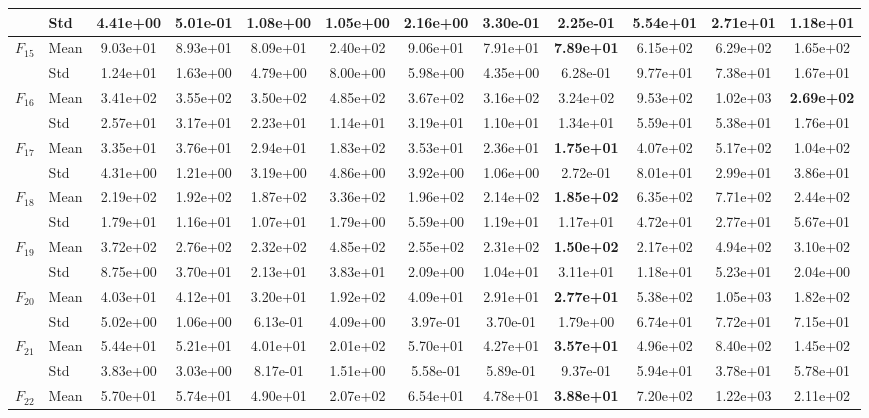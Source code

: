 \begin{center}
\begin{longtable}{clcccccccccc}
 & Std & 4.41e+00 & 5.01e-01 & 1.08e+00 & 1.05e+00 & 2.16e+00 & 3.30e-01 & 2.25e-01 & 5.54e+01 & 2.71e+01 & 1.18e+01 \\
\midrule
$F_{15}$ & Mean & 9.03e+01 & 8.93e+01 & 8.09e+01 & 2.40e+02 & 9.06e+01 & 7.91e+01 & \textbf{7.89e+01} & 6.15e+02 & 6.29e+02 & 1.65e+02 \\
 & Std & 1.24e+01 & 1.63e+00 & 4.79e+00 & 8.00e+00 & 5.98e+00 & 4.35e+00 & 6.28e-01 & 9.77e+01 & 7.38e+01 & 1.67e+01 \\
\midrule
$F_{16}$ & Mean & 3.41e+02 & 3.55e+02 & 3.50e+02 & 4.85e+02 & 3.67e+02 & 3.16e+02 & 3.24e+02 & 9.53e+02 & 1.02e+03 & \textbf{2.69e+02} \\
 & Std & 2.57e+01 & 3.17e+01 & 2.23e+01 & 1.14e+01 & 3.19e+01 & 1.10e+01 & 1.34e+01 & 5.59e+01 & 5.38e+01 & 1.76e+01 \\
\midrule
$F_{17}$ & Mean & 3.35e+01 & 3.76e+01 & 2.94e+01 & 1.83e+02 & 3.53e+01 & 2.36e+01 & \textbf{1.75e+01} & 4.07e+02 & 5.17e+02 & 1.04e+02 \\
 & Std & 4.31e+00 & 1.21e+00 & 3.19e+00 & 4.86e+00 & 3.92e+00 & 1.06e+00 & 2.72e-01 & 8.01e+01 & 2.99e+01 & 3.86e+01 \\
\midrule
$F_{18}$ & Mean & 2.19e+02 & 1.92e+02 & 1.87e+02 & 3.36e+02 & 1.96e+02 & 2.14e+02 & \textbf{1.85e+02} & 6.35e+02 & 7.71e+02 & 2.44e+02 \\
 & Std & 1.79e+01 & 1.16e+01 & 1.07e+01 & 1.79e+00 & 5.59e+00 & 1.19e+01 & 1.17e+01 & 4.72e+01 & 2.77e+01 & 5.67e+01 \\
\midrule
$F_{19}$ & Mean & 3.72e+02 & 2.76e+02 & 2.32e+02 & 4.85e+02 & 2.55e+02 & 2.31e+02 & \textbf{1.50e+02} & 2.17e+02 & 4.94e+02 & 3.10e+02 \\
 & Std & 8.75e+00 & 3.70e+01 & 2.13e+01 & 3.83e+01 & 2.09e+00 & 1.04e+01 & 3.11e+01 & 1.18e+01 & 5.23e+01 & 2.04e+00 \\
\midrule
$F_{20}$ & Mean & 4.03e+01 & 4.12e+01 & 3.20e+01 & 1.92e+02 & 4.09e+01 & 2.91e+01 & \textbf{2.77e+01} & 5.38e+02 & 1.05e+03 & 1.82e+02 \\
 & Std & 5.02e+00 & 1.06e+00 & 6.13e-01 & 4.09e+00 & 3.97e-01 & 3.70e-01 & 1.79e+00 & 6.74e+01 & 7.72e+01 & 7.15e+01 \\
\midrule
$F_{21}$ & Mean & 5.44e+01 & 5.21e+01 & 4.01e+01 & 2.01e+02 & 5.70e+01 & 4.27e+01 & \textbf{3.57e+01} & 4.96e+02 & 8.40e+02 & 1.45e+02 \\
 & Std & 3.83e+00 & 3.03e+00 & 8.17e-01 & 1.51e+00 & 5.58e-01 & 5.89e-01 & 9.37e-01 & 5.94e+01 & 3.78e+01 & 5.78e+01 \\
\midrule
$F_{22}$ & Mean & 5.70e+01 & 5.74e+01 & 4.90e+01 & 2.07e+02 & 6.54e+01 & 4.78e+01 & \textbf{3.88e+01} & 7.20e+02 & 1.22e+03 & 2.11e+02 \\

\end{longtable}
\end{center}
